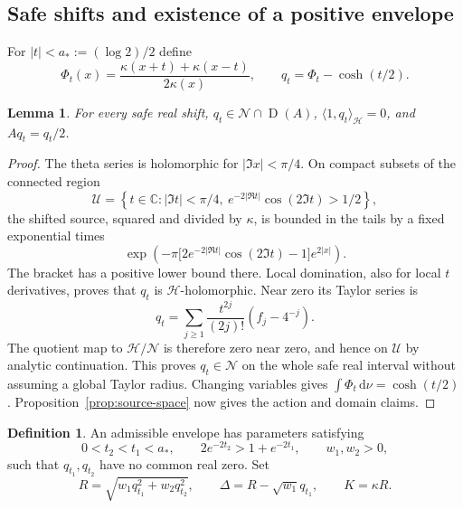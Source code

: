 \documentclass[11pt,a4paper]{article}
\newcommand{\C}{\mathbb C}
\newcommand{\HH}{\mathcal H}
\newcommand{\NN}{\mathcal N}
\newcommand{\ip}[2]{\langle #1,#2\rangle}
\newcommand{\abs}[1]{\lvert #1\rvert}
\newcommand{\dd}{\,\mathrm d}
\newcommand{\Dom}{\operatorname{D}}
\newtheorem{lemma}[theorem]{Lemma}
\theoremstyle{definition}
\newtheorem{definition}[theorem]{Definition}
\theoremstyle{remark}
\numberwithin{equation}{section}
\begin{document}
\subsection{Safe shifts and existence of a positive envelope}
For $\abs t<a_*:=(\log2)/2$ define
\begin{equation}\label{eq:shifts}
 \Phi_t(x)=\frac{\kappa(x+t)+\kappa(x-t)}{2\kappa(x)},
 \qquad q_t=\Phi_t-\cosh(t/2).
\end{equation}
\begin{lemma}\label{lem:shifts}
For every safe real shift, $q_t\in\NN\cap\Dom(A)$,
$\ip1{q_t}_{\HH}=0$, and $Aq_t=q_t/2$.
\end{lemma}
\begin{proof}
The theta series is holomorphic for $\abs{\Im x}<\pi/4$. On compact
subsets of the connected region
\begin{equation}\label{eq:shift-region}
 \mathcal U=\left\{t\in\C:\abs{\Im t}<\pi/4,
         \ e^{-2\abs{\Re t}}\cos(2\Im t)>1/2\right\},
\end{equation}
the shifted source, squared and divided by $\kappa$, is bounded in the
tails by a fixed exponential times
\[
 \exp\left(-\pi\bigl[2e^{-2\abs{\Re t}}\cos(2\Im t)-1\bigr]
                 e^{2\abs x}\right).
\]
The bracket has a positive lower bound there. Local domination, also for
local $t$ derivatives, proves that $q_t$ is $\HH$-holomorphic.
Near zero its Taylor series is
\[
 q_t=\sum_{j\ge1}\frac{t^{2j}}{(2j)!}(f_j-4^{-j}).
\]
The quotient map to $\HH/\NN$ is therefore zero near zero, and hence on
$\mathcal U$ by analytic continuation. This proves $q_t\in\NN$ on the
whole safe real interval without assuming a global Taylor radius.
Changing variables gives $\int\Phi_t\dd\nu=\cosh(t/2)$.
Proposition~\ref{prop:source-space} now gives the action and domain claims.
\end{proof}

\begin{definition}\label{def:envelope}
An admissible envelope has parameters satisfying
\begin{equation}\label{eq:envelope-parameters}
 0<t_2<t_1<a_*,\qquad
 2e^{-2t_2}>1+e^{-2t_1},\qquad w_1,w_2>0,
\end{equation}
such that $q_{t_1},q_{t_2}$ have no common real zero. Set
\begin{equation}\label{eq:envelope}
 R=\sqrt{w_1q_{t_1}^2+w_2q_{t_2}^2},\qquad
 \Delta=R-\sqrt{w_1}q_{t_1},\qquad K=\kappa R.
\end{equation}
\end{definition}
\end{document}
